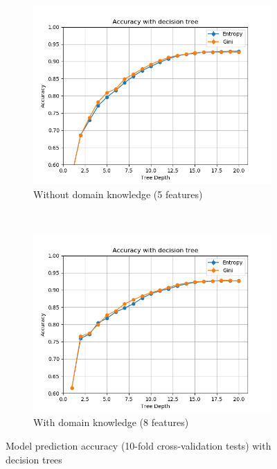 \documentclass{article}
\begin{document}
\begin{figure}[h!]
    \centering
    \begin{subfigure}[b]{0.45\textwidth}
        \includegraphics[width=\textwidth]{../figures/wo_domain_knowledge/accuracy_decision_tree.png}
        \caption{Without domain knowledge (5  features)}
        \label{fig:dt_wo}
    \end{subfigure}
    ~ %
    \begin{subfigure}[b]{0.45\textwidth}
        \includegraphics[width=\textwidth]{../figures/w_domain_knowledge/accuracy_decision_tree.png}
        \caption{With domain knowledge (8  features)}
        \label{fig:dt_w}
    \end{subfigure}
    \caption{Model prediction accuracy (10-fold cross-validation tests) with decision trees}
    \label{fig:dt}
\end{figure}
\end{document}
